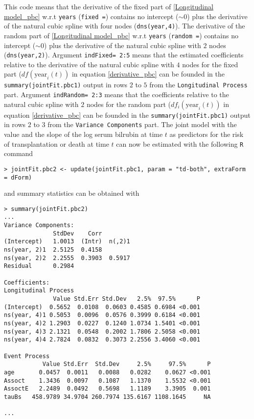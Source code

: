 \documentclass[12pt]{article}
\begin{document}
This code means that the derivative of the fixed part of \eqref{Longitudinal model_pbc} w.r.t \texttt{years} (\texttt{fixed =}) contains no intercept (\texttt{$\sim 0$}) plus the derivative of the natural cubic spline with four nodes (\texttt{dns(year,4)}). The derivative of the random part of \eqref{Longitudinal model_pbc} w.r.t \texttt{years} (\texttt{random =}) contains no intercept (\texttt{$\sim 0$}) plus the derivative of the natural cubic spline with $2$ nodes (\texttt{dns(year,2)}). Argument \texttt{indFixed= 2:5} means that the estimated coefficients relative to the derivative of the natural cubic spline with $4$ nodes for the fixed part ($df(\text{year}_i(t))$ in equation \eqref{derivative_pbc} can be founded in the \texttt{summary(jointFit.pbc1)} output in rows $2$ to $5$ from the \texttt{Longitudinal Process} part. Argument \texttt{indRandom= 2:3} means that the coefficients relative to the natural cubic spline with $2$ nodes for the random part ($df_i(\text{year}_i(t))$ in equation \eqref{derivative_pbc} can be founded in the \texttt{summary(jointFit.pbc1)} output in rows $2$ to $3$ from the \texttt{Variance Components} part. The joint model with the value and the slope of the log serum bilrubin at time $t$ as predictors for the risk of transplantation or death at time $t$ can now be estimated with the following \texttt{R} command
\begin{verbatim}
> jointFit.pbc2 <- update(jointFit.pbc1, param = "td-both", extraForm = dForm)
\end{verbatim}
and summary statistics can be obtained with 
\begin{verbatim}
> summary(jointFit.pbc2)
...
Variance Components:
              StdDev    Corr        
(Intercept)   1.0013  (Intr)  n(,2)1
ns(year, 2)1  2.5125  0.4158        
ns(year, 2)2  2.2555  0.3903  0.5917
Residual      0.2984                

Coefficients:
Longitudinal Process
              Value Std.Err Std.Dev   2.5%  97.5%      P
(Intercept)  0.5652  0.0108  0.0603 0.4585 0.6984 <0.001
ns(year, 4)1 0.5053  0.0096  0.0576 0.3999 0.6184 <0.001
ns(year, 4)2 1.2903  0.0227  0.1240 1.0734 1.5401 <0.001
ns(year, 4)3 2.1321  0.0548  0.2002 1.7806 2.5058 <0.001
ns(year, 4)4 2.7824  0.0832  0.3073 2.2556 3.4060 <0.001

Event Process
           Value Std.Err  Std.Dev     2.5%     97.5%      P
age       0.0457  0.0011   0.0088   0.0282    0.0627 <0.001
Assoct    1.3436  0.0097   0.1087   1.1370    1.5532 <0.001
AssoctE   2.2489  0.0492   0.5698   1.1189    3.3905  0.001
tauBs   458.9789 34.9704 260.7974 135.6167 1108.1645     NA

...
\end{verbatim}
\end{document}

